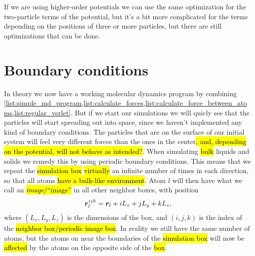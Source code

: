 If we are using higher-order potentials we can use the same optimization for the two-particle terms of the potential, but it's a bit more complicated for the terms depending on the positions of three or more particles, but there are still optimizations that can be done.




\section{Boundary conditions}
In theory we now have a working molecular dynamics program by combining \cref{list:simple_md_program,list:calculate_forces,list:calculate_force_between_atoms,list:regular_verlet}. But if we start our simulations we will quicly see that the particles will start spreading out into space, since we haven't implemented any kind of boundary conditions. The particles that are on the surface of our initial system will feel very different forces than the ones in the center\hl{, and, depending on the potential, will not behave as intended?}. When simulating \hl{bulk} liquids and solids we remedy this by using periodic boundary conditions. This means that we repeat the \hl{simulation box} \hl{virtually} an infinite number of times in each direction, so that all atoms \hl{have a bulk-like environment}. Atom $l$ will then have what we call an \hl{\emph{image}/``image''} in all other neighbor boxes, with position
\begin{align}
    \boldsymbol{r}_l^{ijk} = \boldsymbol{r}_l + iL_x + jL_y + kL_z,
    \label{eq:pbc_positions}
\end{align}
where $(L_x, L_y, L_z)$ is the dimensions of the box, and $(i, j, k)$ is the index of the \hl{neighbor box/periodic image box}. In reality we still have the same number of atoms, but the atoms on near the boundaries of the \hl{simulation box} will now be \hl{affected} by the atoms on the opposite side of the \hl{box}.


